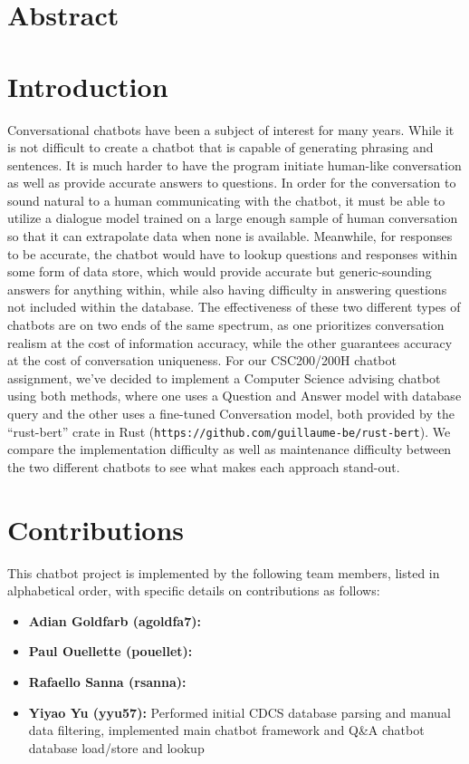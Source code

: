 \section{Abstract}

\section{Introduction}

Conversational chatbots have been a subject of interest for many years. While
it is not difficult to create a chatbot that is capable of generating phrasing
and sentences. It is much harder to have the program initiate human-like
conversation as well as provide accurate answers to questions. In order for the
conversation to sound natural to a human communicating with the chatbot, it must
be able to utilize a dialogue model trained on a large enough sample of human
conversation so that it can extrapolate data when none is available. Meanwhile,
for responses to be accurate, the chatbot would have to lookup questions and
responses within some form of data store, which would provide accurate but
generic-sounding answers for anything within, while also having difficulty in
answering questions not included within the database. The effectiveness of these
two different types of chatbots are on two ends of the same spectrum, as one
prioritizes conversation realism at the cost of information accuracy, while the
other guarantees accuracy at the cost of conversation uniqueness. For our
CSC200/200H chatbot assignment, we've decided to implement a Computer Science
advising chatbot using both methods, where one uses a Question and Answer model
with database query and the other uses a fine-tuned Conversation model, both
provided by the ``rust-bert'' crate in Rust
(\verb|https://github.com/guillaume-be/rust-bert|). We compare the
implementation difficulty as well as maintenance difficulty between the two
different chatbots to see what makes each approach stand-out.

\section{Contributions}

This chatbot project is implemented by the following team members, listed in
alphabetical order, with specific details on contributions as follows:

\begin{itemize}
\item \textbf{Adian Goldfarb (agoldfa7):} %
\item \textbf{Paul Ouellette (pouellet):} %
\item \textbf{Rafaello Sanna (rsanna):} %
\item \textbf{Yiyao Yu (yyu57):} Performed initial CDCS database parsing and
manual data filtering, implemented main chatbot framework and Q\&A chatbot
database load/store and lookup
\end{itemize}


